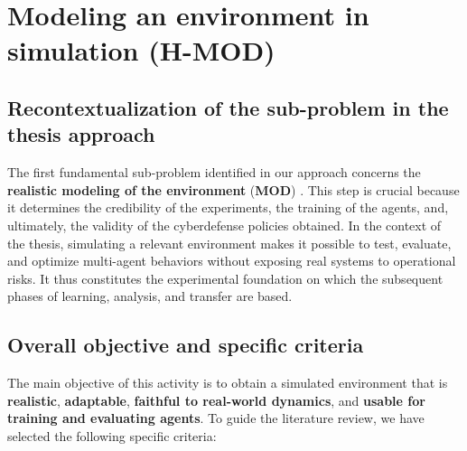 \section{Modeling an environment in simulation (H-MOD)}

\subsection*{Recontextualization of the sub-problem in the thesis approach}

The first fundamental sub-problem identified in our approach concerns the \textbf{realistic modeling of the environment} (\textbf{MOD}) . This step is crucial because it determines the credibility of the experiments, the training of the agents, and, ultimately, the validity of the cyberdefense policies obtained. In the context of the thesis, simulating a relevant environment makes it possible to test, evaluate, and optimize multi-agent behaviors without exposing real systems to operational risks. It thus constitutes the experimental foundation on which the subsequent phases of learning, analysis, and transfer are based. \subsection* {Overall objective and specific criteria} The main objective of this activity is to obtain a simulated environment that is \textbf{realistic}, \textbf{adaptable}, \textbf{faithful to real-world dynamics}, and \textbf{usable for training and evaluating agents}. To guide the literature review, we have selected the following specific criteria:
%
